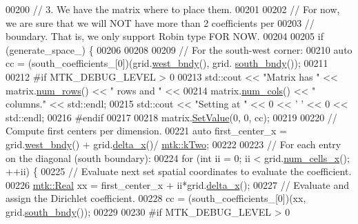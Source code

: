 \begin{DoxyCode}
00200   \textcolor{comment}{// 3. We have the matrix where to place them.}
00201 
00202   \textcolor{comment}{// For now, we are sure that we will NOT have more than 2 coefficients per}
00203   \textcolor{comment}{// boundary. That is, we only support Robin type FOR NOW.}
00204 
00205   \textcolor{keywordflow}{if} (generate\_space\_) \{
00206 
00208 
00209     \textcolor{comment}{// For the south-west corner:}
00210     \textcolor{keyword}{auto} cc = (south\_coefficients\_[0])(grid.\hyperlink{classmtk_1_1UniStgGrid2D_af2b1712387ded85edaf2b64617d3fc13}{west\_bndy}(), grid.
      \hyperlink{classmtk_1_1UniStgGrid2D_a1442eaf219f099d0ebf46a170fdebf92}{south\_bndy}());
00211 
00212 \textcolor{preprocessor}{    #if MTK\_DEBUG\_LEVEL > 0}
00213     std::cout << \textcolor{stringliteral}{"Matrix has "} << matrix.\hyperlink{classmtk_1_1DenseMatrix_a53f3afb3b6a8d21854458aaa9663cc74}{num\_rows}() << \textcolor{stringliteral}{" rows and "} <<
00214       matrix.\hyperlink{classmtk_1_1DenseMatrix_a41747502d468c6728a4be31501b16e0e}{num\_cols}() << \textcolor{stringliteral}{" columns."} << std::endl;
00215     std::cout << \textcolor{stringliteral}{"Setting at "} << 0 << \textcolor{charliteral}{' '} << 0 << std::endl;
00216 \textcolor{preprocessor}{    #endif}
00217 
00218     matrix.\hyperlink{classmtk_1_1DenseMatrix_a784ce5784109ac86bfb9d8562b334b13}{SetValue}(0, 0, cc);
00219 
00220     \textcolor{comment}{// Compute first centers per dimension.}
00221     \textcolor{keyword}{auto} first\_center\_x = grid.\hyperlink{classmtk_1_1UniStgGrid2D_af2b1712387ded85edaf2b64617d3fc13}{west\_bndy}() + grid.\hyperlink{classmtk_1_1UniStgGrid2D_aca4710004c4a7da6a9e8fd6ab32a691f}{delta\_x}()/
      \hyperlink{group__c01-roots_gaf39c2d851a2db744f4feb1c5ab3ec2cf}{mtk::kTwo};
00222 
00223     \textcolor{comment}{// For each entry on the diagonal (south boundary):}
00224     \textcolor{keywordflow}{for} (\textcolor{keywordtype}{int} ii = 0; ii < grid.\hyperlink{classmtk_1_1UniStgGrid2D_a2d182866a398aba8e4829590e85bf939}{num\_cells\_x}(); ++ii) \{
00225       \textcolor{comment}{// Evaluate next set spatial coordinates to evaluate the coefficient.}
00226       \hyperlink{group__c01-roots_gac080bbbf5cbb5502c9f00405f894857d}{mtk::Real} xx = first\_center\_x + ii*grid.\hyperlink{classmtk_1_1UniStgGrid2D_aca4710004c4a7da6a9e8fd6ab32a691f}{delta\_x}();
00227       \textcolor{comment}{// Evaluate and assign the Dirichlet coefficient.}
00228       cc = (south\_coefficients\_[0])(xx, grid.\hyperlink{classmtk_1_1UniStgGrid2D_a1442eaf219f099d0ebf46a170fdebf92}{south\_bndy}());
00229 
00230 \textcolor{preprocessor}{      #if MTK\_DEBUG\_LEVEL > 0}

\end{DoxyCode}
